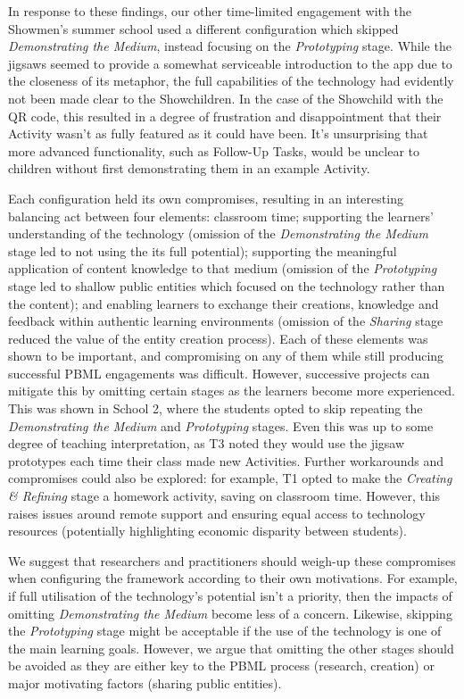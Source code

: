 \documentclass[,hyphens]{sigchi}
\begin{document}
In response to these findings, our other time-limited engagement with the Showmen's summer school used a different configuration which skipped \textit{Demonstrating the Medium}, instead focusing on the \textit{Prototyping} stage. While the jigsaws seemed to provide a somewhat serviceable introduction to the app due to the closeness of its metaphor, the full capabilities of the technology had evidently not been made clear to the Showchildren. In the case of the Showchild with the QR code, this resulted in a degree of frustration and disappointment that their Activity wasn't as fully featured as it could have been. It's unsurprising that more advanced functionality, such as Follow-Up Tasks, would be unclear to children without first demonstrating them in an example Activity.

Each configuration held its own compromises, resulting in an interesting balancing act between four elements: classroom time; supporting the learners' understanding of the technology (omission of the \textit{Demonstrating the Medium} stage led to not using the its full potential); supporting the meaningful application of content knowledge to that medium (omission of the \textit{Prototyping} stage led to shallow public entities which focused on the technology rather than the content); and enabling learners to exchange their creations, knowledge and feedback within authentic learning environments (omission of the \textit{Sharing} stage reduced the value of the entity creation process). Each of these elements was shown to be important, and compromising on any of them while still producing successful PBML engagements was difficult. However, successive projects can mitigate this by omitting certain stages as the learners become more experienced. This was shown in School 2, where the students opted to skip repeating the \textit{Demonstrating the Medium} and \textit{Prototyping} stages. Even this was up to some degree of teaching interpretation, as T3 noted they would use the jigsaw prototypes each time their class made new Activities. Further workarounds and compromises could also be explored: for example, T1 opted to make the \textit{Creating \& Refining} stage a homework activity, saving on classroom time. However, this raises issues around remote support and ensuring equal access to technology resources (potentially highlighting economic disparity between students).

We suggest that researchers and practitioners should weigh-up these compromises when configuring the framework according to their own motivations. For example, if full utilisation of the technology's potential isn't a priority, then the impacts of omitting \textit{Demonstrating the Medium} become less of a concern. Likewise, skipping the \textit{Prototyping} stage might be acceptable if the use of the technology is one of the main learning goals. However, we argue that omitting the other stages should be avoided as they are either key to the PBML process (research, creation) or major motivating factors (sharing public entities).
\end{document}
